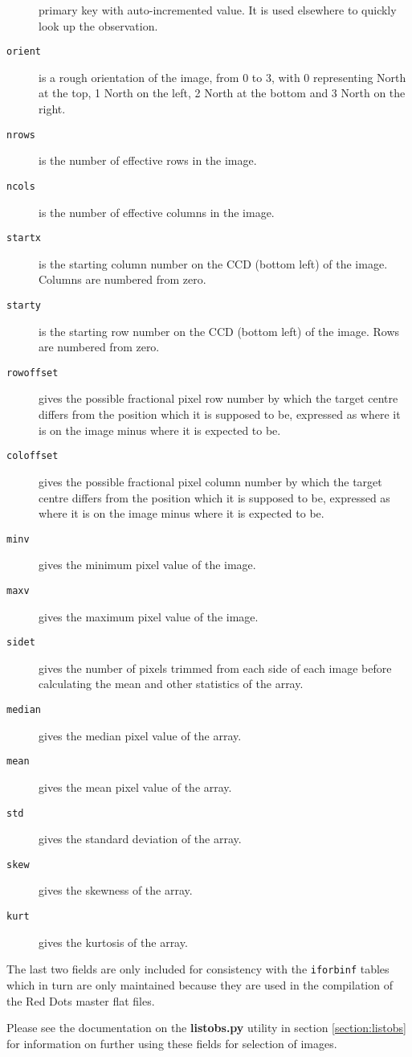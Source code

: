 \begin{description}
primary key with auto-incremented value. It is used elsewhere to quickly look up
the observation.
\item[\tt orient] is a rough orientation of the image, from 0 to 3, with 0
representing North at the top, 1 North on the left, 2 North at the bottom and 3
North on the right.
\item[\tt nrows] is the number of effective rows in the image.
\item[\tt ncols] is the number of effective columns in the image.
\item[\tt startx] is the starting column number on the CCD (bottom left) of the
image. Columns are numbered from zero.
\item[\tt starty] is the starting row number on the CCD (bottom left) of the image.
Rows are numbered from zero.
\item[\tt rowoffset] gives the possible fractional pixel row number by which the
target centre differs from the position which it is supposed to be, expressed as
where it is on the image minus where it is expected to be.
\item[\tt coloffset] gives the possible fractional pixel column number by which the
target centre differs from the position which it is supposed to be, expressed as
where it is on the image minus where it is expected to be.
\item[\tt minv] gives the minimum pixel value of the image.
\item[\tt maxv] gives the maximum pixel value of the image.
\item[\tt sidet] gives the number of pixels trimmed from each side of each image
before calculating the mean and other statistics of the array.
\item[\tt median] gives the median pixel value of the array.
\item[\tt mean] gives the mean pixel value of the array.
\item[\tt std] gives the standard deviation of the array.
\item[\tt skew] gives the skewness of the array.
\item[\tt kurt] gives the kurtosis of the array.
\end{description}

The last two fields are only included for consistency with the
\texttt{iforbinf} tables which in turn are only maintained because they are
used in the compilation of the Red Dots master flat files.

Please see the documentation on the \textbf{listobs.py} utility in section
\ref{section:listobs} for information on further using these fields for
selection of images.

